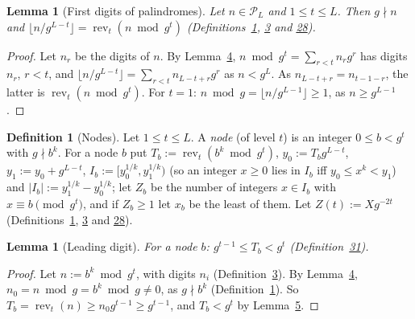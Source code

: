 \documentclass[11pt]{article}
\newcounter{hffc}
\theoremstyle{definition}\newtheorem{hffdef}[hffc]{Definition}
\theoremstyle{plain}\newtheorem{hfflem}[hffc]{Lemma}\newtheorem{hffthm}[hffc]{Theorem}
\theoremstyle{remark}\newtheorem{hffrem}[hffc]{Remark}
\newcommand{\hffcost}{}
\newcommand{\setcost}[1]{\renewcommand{\hffcost}{#1}}
\newcommand{\rev}{\operatorname{rev}}
\newcommand{\cP}{\mathcal{P}}\newcommand{\cQ}{\mathcal{Q}}\newcommand{\cB}{\mathcal{B}}\newcommand{\cT}{\mathcal{T}}
\begin{document}
\begin{hfflem}[First digits of palindromes]\label{L:first}
Let $n\in\cP_L$ and $1\le t\le L$. Then $g\nmid n$ and $\lfloor n/g^{L-t}\rfloor=\rev_t(n\bmod g^t)$ (Definitions~\hyperref[D:conv]{1}, \hyperref[D:digits]{3} and \hyperref[D:pal]{28}).
\par\nopagebreak{}
\end{hfflem}
\begin{proof}\setcost{length 162/300}Let $n_r$ be the digits of $n$. By Lemma~\hyperref[L:window]{4}, $n\bmod g^t=\sum_{r<t}n_rg^r$ has digits $n_r$, $r<t$, and $\lfloor n/g^{L-t}\rfloor=\sum_{r<t}n_{L-t+r}g^r$ as $n<g^L$. As $n_{L-t+r}=n_{t-1-r}$, the latter is $\rev_t(n\bmod g^t)$. For $t=1$: $n\bmod g=\lfloor n/g^{L-1}\rfloor\ge1$, as $n\ge g^{L-1}$.
\end{proof}

\begin{hffdef}[Nodes]\label{D:node}
Let $1\le t\le L$. A \emph{node} (of level $t$) is an integer $0\le b<g^t$ with $g\nmid b^k$. For a node $b$ put $T_b:=\rev_t(b^k\bmod g^t)$, $y_0:=T_bg^{L-t}$, $y_1:=y_0+g^{L-t}$, $I_b:=[y_0^{1/k},y_1^{1/k})$ (so an integer $x\ge0$ lies in $I_b$ iff $y_0\le x^k<y_1$) and $|I_b|:=y_1^{1/k}-y_0^{1/k}$; let $Z_b$ be the number of integers $x\in I_b$ with $x\equiv b\pmod{g^t}$, and if $Z_b\ge1$ let $x_b$ be the least of them. Let $Z(t):=Xg^{-2t}$ (Definitions~\hyperref[D:conv]{1}, \hyperref[D:digits]{3} and \hyperref[D:pal]{28}).
\par\nopagebreak{}
\end{hffdef}

\begin{hfflem}[Leading digit]\label{L:lead}
For a node $b$: $g^{t-1}\le T_b<g^t$ (Definition~\hyperref[D:node]{31}).
\par\nopagebreak{}
\end{hfflem}
\begin{proof}\setcost{length 130/300}Let $n:=b^k\bmod g^t$, with digits $n_i$ (Definition~\hyperref[D:digits]{3}). By Lemma~\hyperref[L:window]{4}, $n_0=n\bmod g=b^k\bmod g\ne0$, as $g\nmid b^k$ (Definition~\hyperref[D:conv]{1}). So $T_b=\rev_t(n)\ge n_0g^{t-1}\ge g^{t-1}$, and $T_b<g^t$ by Lemma~\hyperref[L:inv]{5}.
\end{proof}
\end{document}
